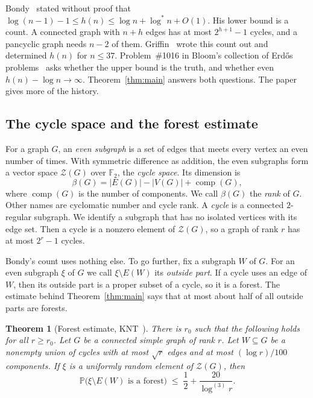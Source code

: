 \documentclass[11pt]{article}
\newtheorem{theorem}{Theorem}[section]
\theoremstyle{definition}
\theoremstyle{remark}
\newcommand{\Z}{\mathcal{Z}}
\newcommand{\PP}{\mathbb{P}}
\newcommand{\comp}{\operatorname{comp}}
\newcommand{\lgs}{\log^{*}}
\newcommand{\lgk}[1]{\log^{(#1)}}
\newcommand{\sm}{\setminus}
\numberwithin{equation}{section}
\begin{document}
Bondy~\cite{Bondy} stated without proof that $\log(n-1)-1\le h(n)\le\log n+\lgs n+O(1)$. His lower
bound is a count. A connected graph with $n+h$ edges has at most $2^{h+1}-1$ cycles, and a pancyclic
graph needs $n-2$ of them. Griffin~\cite{Griffin} wrote this count out and determined $h(n)$ for
$n\le37$. Problem~\#1016 in Bloom's collection of Erd\H{o}s problems~\cite{Bloom}
asks whether the upper bound is the truth, and whether even $h(n)-\log n\to\infty$.
Theorem~\ref{thm:main} answers both questions. The paper~\cite{KNT} gives more of the history.

\subsection{The cycle space and the forest estimate}

For a graph $G$, an \emph{even subgraph} is a set of edges that meets every vertex an even number of
times. With symmetric difference as addition, the even subgraphs form a vector space $\Z(G)$ over
$\mathbb{F}_2$, the \emph{cycle space}. Its dimension is
\[
  \beta(G)=|E(G)|-|V(G)|+\comp(G),
\]
where $\comp(G)$ is the number of components. We call $\beta(G)$ the \emph{rank} of $G$. Other names
are cyclomatic number and cycle rank. A \emph{cycle} is a connected $2$-regular subgraph. We
identify a subgraph that has no isolated vertices with its edge set. Then a cycle is a nonzero
element of $\Z(G)$, so a graph of rank $r$ has at most $2^{r}-1$ cycles.

Bondy's count uses nothing else. To go further, fix a subgraph $W$ of $G$. For an even subgraph
$\xi$ of $G$ we call $\xi\sm E(W)$ its \emph{outside part}. If a cycle uses an edge of $W$, then its
outside part is a proper subset of a cycle, so it is a forest. The estimate behind
Theorem~\ref{thm:main} says that at most about half of all outside parts are forests.

\begin{theorem}[Forest estimate, KNT~\cite{KNT}]\label{thm:forest}
There is $r_0$ such that the following holds for all $r\ge r_0$. Let $G$ be a connected simple graph
of rank $r$. Let $W\subseteq G$ be a nonempty union of cycles with at most $\sqrt r$ edges and at
most $(\log r)/100$ components. If $\xi$ is a uniformly random element of $\Z(G)$, then
\begin{equation}\label{eq:forest}
  \PP\bigl(\xi\sm E(W)\text{ is a forest}\bigr)\;\le\;\frac12+\frac{20}{\lgk{3}r}.
\end{equation}
\end{theorem}
\end{document}
